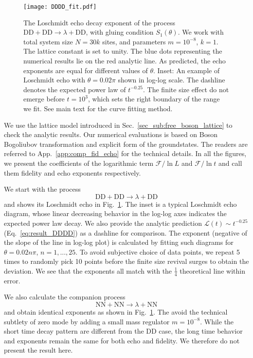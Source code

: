 \begin{figure}[h]
\texttt{[image: DDDD\_fit.pdf]}
\caption{The Loschmidt echo decay exponent of the process $\text{DD}+\text{DD}\rightarrow\lambda+\text{DD}$, with gluing condition $S_1(\theta)$. We work with total system size $N = 30k$ sites, and parameters $m = 10^{-8}$, $k = 1$. The lattice constant is set to unity. The blue dots representing the numerical results lie on the red analytic line. As predicted, the echo exponents are equal for different values of $\theta$. Inset: An example of Loschmidt echo with $\theta = 0.02 \pi$ shown in log-log scale. The dashline denotes the expected power law of $t^{-0.25}$. The finite size effect do not emerge before $t=10^{3}$, which sets the right boundary of the range we fit. See main text for the curve fitting method.}
\label{fig:DDDD}
\end{figure}

We use the lattice model introduced in Sec.~\ref{sec_sub:free_boson_lattice} to check the analytic results. Our numerical evaluations is based on Boson Bogoliubov transformation and explicit form of the groundstates. The readers are referred to App.~\ref{app:comp_fid_echo} for the technical details. In all the figures, we present the coefficients of the logarithmic term $\mathcal{F} / \ln L$ and $\mathcal{F} / \ln t$ and call them fidelity and echo exponents respectively. 

We start with the process
\begin{equation}
\text{DD}+\text{DD}\rightarrow\lambda+\text{DD}
\end{equation}
and shows its Loschmidt echo in Fig.~\ref{fig:DDDD}. The inset is a typical Loschmidt echo diagram, whose linear decreasing behavior in the log-log axes indicates the expected power law decay. We also provide the analytic prediction $\mathcal{L}(t)\sim t^{-0.25}$ (\cf Eq.~\eqref{eq:result_DDDD}) as a dashline for comparison. The exponent (negative of the slope of the line in log-log plot) is calculated by fitting such diagrams for $\theta = 0.02n \pi$, $n = 1,...,25 $. To avoid subjective choice of data points, we repeat 5 times to randomly pick {\color{red} 10 points} before the finite size revival surges to obtain the deviation. We see that the exponents all match with the $\frac{1}{4}$ theoretical line within error. 

We also calculate the companion process
\begin{equation}
 \text{NN}+\text{NN}\rightarrow\lambda+\text{NN}
\end{equation}
and obtain identical exponents as shown in Fig.~\ref{fig:DDDD}. The avoid the technical subtlety of zero mode by adding a small mass regulator $m=10^{-8}$. While the short time decay pattern are different from the DD case, the long time behavior and exponents remain the same for both echo and fidelity. We therefore do not present the result here. 

